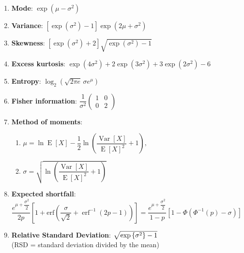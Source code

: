 \begin{enumerate}
    \item \textbf{Mode}: ${\displaystyle \exp \left(\mu -\sigma ^{2}\right)}$
    \hfill \cite{wiki/Log-normal_distribution}

    \item \textbf{Variance}:
    ${\displaystyle \left[\exp(\sigma ^{2})-1\right]\exp \left(2\mu +\sigma ^{2}\right)}$
    \hfill \cite{wiki/Log-normal_distribution}

    \item \textbf{Skewness}:
    ${\displaystyle \left[\exp \left(\sigma ^{2}\right)+2\right]{\sqrt {\exp(\sigma ^{2})-1}}}$
    \hfill \cite{wiki/Log-normal_distribution}

    \item \textbf{Excess kurtosis}:
    ${\displaystyle \exp \left(4\sigma ^{2}\right)+2\exp \left(3\sigma ^{2}\right)+3\exp \left(2\sigma ^{2}\right)-6}$
    \hfill \cite{wiki/Log-normal_distribution}

    \item \textbf{Entropy}: ${\displaystyle \log _{2}\left({\sqrt {2\pi e}}\,\sigma e^{\mu }\right)}$
    \hfill \cite{wiki/Log-normal_distribution}

    \item \textbf{Fisher information}:
    ${\displaystyle {\dfrac {1}{\sigma ^{2}}}{\begin{pmatrix}1&0\\0&2\end{pmatrix}}}$
    \hfill \cite{wiki/Log-normal_distribution}

    \item \textbf{Method of moments}:
    \begin{enumerate}
        \item ${\displaystyle \mu =\ln \operatorname {E} [X]-{\dfrac {1}{2}}\ln \left({\dfrac {\operatorname {Var} [X]}{\operatorname {E} [X]^{2}}}+1\right),}$
        \hfill \cite{wiki/Log-normal_distribution}

        \item ${\displaystyle \sigma ={\sqrt {\ln \left({\dfrac {\operatorname {Var} [X]}{\operatorname {E} [X]^{2}}}+1\right)}}}$
        \hfill \cite{wiki/Log-normal_distribution}
    \end{enumerate}

    \item \textbf{Expected shortfall}:
    $
        {\displaystyle {{\dfrac {e^{\mu +{\dfrac {\sigma ^{2}}{2}}}}{2p}}\left[1+\text{erf} \left({\dfrac {\sigma }{\sqrt {2}}}+\operatorname {erf} ^{-1}(2p-1)\right)\right]
        ={\dfrac {e^{\mu +{\dfrac {\sigma ^{2}}{2}}}}{1-p}}\left[1-\Phi (\Phi ^{-1}(p)-\sigma )\right]}}
    $
    \hfill \cite{wiki/Log-normal_distribution}

    \item \textbf{Relative Standard Deviation}: $\sqrt{\exp\left\{\sigma^2\right\} - 1}$
    \hfill \cite{statistics/book/Statistics-for-Data-Scientists/Maurits-Kaptein}
    \\
    (RSD = standard deviation divided by the mean)
    \hfill \cite{statistics/book/Statistics-for-Data-Scientists/Maurits-Kaptein}
\end{enumerate}






